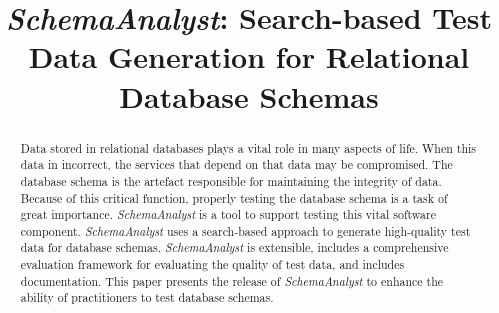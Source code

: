 \documentclass[conference]{IEEEtran}
\begin{document}
\title{\textit{SchemaAnalyst}: Search-based Test Data Generation for Relational Database Schemas}

\author{
\and
{}
}
\maketitle

\begin{abstract}
Data stored in relational databases plays a vital role in many aspects of life.
When this data in incorrect, the services that depend on that data may be compromised.
The database schema is the artefact responsible for maintaining the integrity of data. Because of this
critical function, properly testing the database schema is a task of great importance.
\textit{SchemaAnalyst} is a tool to support testing this vital software component.
\textit{SchemaAnalyst} uses a search-based approach to generate high-quality test data for database
schemas. \textit{SchemaAnalyst} is extensible, includes a comprehensive evaluation framework for
evaluating the quality of test data, and includes documentation. This paper presents the release of
\textit{SchemaAnalyst} to enhance the ability of practitioners to test database schemas.
\end{abstract}










\end{document}
